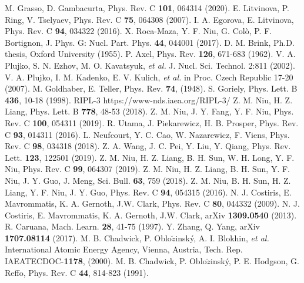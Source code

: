 \documentclass[twocolumn,showpacs,superscriptaddress,amsmath,amssymb,prc,preprintnumbers]{revtex4-1}
\begin{document}
\begin{thebibliography}{99}
 M. Grasso, D. Gambacurta, Phys. Rev. C \textbf{101}, 064314 (2020).
 E. Litvinova, P. Ring, V. Tselyaev, Phys. Rev. C \textbf{75}, 064308 (2007).
 I. A. Egorova, E. Litvinova, Phys. Rev. C \textbf{94}, 034322 (2016).
 X. Roca-Maza, Y. F. Niu, G. Col{\`{o}}, P. F. Bortignon, J. Phys. G: Nucl. Part. Phys. \textbf{44}, 044001 (2017).
 D. M. Brink, Ph.D. thesis, Oxford University (1955).
 P. Axel, Phys. Rev. \textbf{126}, 671-683 (1962).
 V. A. Plujko, S. N. Ezhov, M. O. Kavatsyuk, \emph{et al.} J. Nucl. Sci. Technol. 2:811 (2002).
 V. A. Plujko, I. M. Kadenko, E. V. Kulich, \emph{et al.} in Proc. Czech Republic 17-20 (2007).
 M. Goldhaber, E. Teller, Phys. Rev. \textbf{74},  (1948).
 S. Goriely, Phys. Lett. B  \textbf{436}, 10-18 (1998).
 RIPL-3 https://www-nds.iaea.org/RIPL-3/
 Z. M. Niu, H. Z. Liang, Phys. Lett. B  \textbf{778}, 48-53 (2018).
 Z. M. Niu, J. Y. Fang, Y. F. Niu, Phys. Rev. C \textbf{100}, 054311 (2019).
 R. Utama, J. Piekarewicz, H. B. Prosper, Phys. Rev. C \textbf{93}, 014311 (2016).
 L. Neufcourt, Y. C. Cao, W. Nazarewicz, F. Viens, Phys. Rev. C \textbf{98}, 034318 (2018).
 Z. A. Wang, J. C. Pei, Y. Liu, Y. Qiang, Phys. Rev. Lett. \textbf{123}, 122501 (2019).
 Z. M. Niu, H. Z. Liang, B. H. Sun, W. H. Long, Y. F. Niu, Phys. Rev. C \textbf{99}, 064307 (2019).
 Z. M. Niu, H. Z. Liang, B. H. Sun, Y. F. Niu, J. Y. Guo, J. Meng, Sci. Bull. \textbf{63}, 759 (2018).
 Z. M. Niu, B. H. Sun, H. Z. Liang, Y. F. Niu, J. Y. Guo, Phys. Rev. C \textbf{94}, 054315 (2016).
 N. J. Costiris, E. Mavrommatis, K. A. Gernoth, J.W. Clark, Phys. Rev. C \textbf{80}, 044332 (2009).
 N. J. Costiris, E. Mavrommatis, K. A. Gernoth, J.W. Clark, arXiv \textbf{1309.0540} (2013).
 R. Caruana, Mach. Learn.  \textbf{28}, 41-75 (1997).
 Y. Zhang, Q. Yang, arXiv \textbf{1707.08114} (2017).
 M. B. Chadwick, P. Oblo$\breve{z}$insk\'y, A. I. Blokhin, \emph{et al.} International Atomic Energy Agency, Vienna, Austria, Tech. Rep. IAEATECDOC-\textbf{1178}, (2000).
 M. B. Chadwick, P. Oblo$\breve{z}$insk\'y, P. E. Hodgson, G. Reffo, Phys. Rev. C \textbf{44}, 814-823 (1991).

\end{thebibliography}
\end{document}
